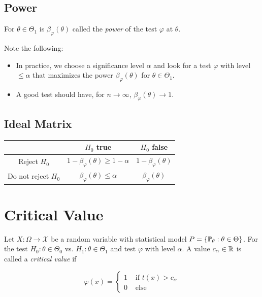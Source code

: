 \subsection{Power}

For \(\theta \in \Theta_1\) is \(\beta_\varphi (\theta)\) called the \emph{power} of the test \(\varphi\) at \(\theta\). 

Note the following:

\begin{itemize}
  
    \item In practice, we choose a significance level \(\alpha\) and look for a test \(\varphi\) with level \(\le \alpha\) that maximizes the power 
    \(\beta_\varphi (\theta)\) for \(\theta \in \Theta_1\).

    \item A good test should have, for \(n \to \infty\), \(\beta_\varphi (\theta) \to 1\).

\end{itemize}

\subsection{Ideal Matrix}

\begin{tabular}{c|c|c}
                & \(H_0\) true          & \(H_0\) false         \\ \hline
    Reject \(H_0\)   & \(1 - \beta_\varphi (\theta) \ge 1 - \alpha\)     & \(1 - \beta_\varphi (\theta)\)          \\ \hline
    Do not reject \(H_0\) & \(\beta_\varphi (\theta) \le \alpha\)        & \(\beta_\varphi (\theta)\)
\end{tabular}

\section{Critical Value}

Let \(X: \Omega \to \mathcal{X}\) be a random variable with statistical model 
\(P = \{\mathbb{P}_\theta : \theta \in \Theta\}\). For the test \(H_0 : \theta \in \Theta_0\) vs. \(H_1: \theta \in \Theta_1\) 
and test \(\varphi\) with level \(\alpha\). A value \(c_\alpha \in \mathbb{R}\) is called a \emph{critical value} if

\[
    \varphi(x) = 
    \begin{cases}
        1 &\text{ if } t(x) > c_\alpha \\ 
        0 &\text{ else }
    \end{cases}
\]

